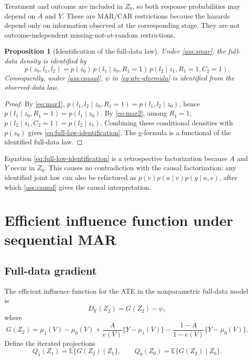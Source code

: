 \documentclass[11pt]{article}
\newtheorem{proposition}{Proposition}
\theoremstyle{definition}
\newcommand{\E}{\mathbb{E}}
\newcommand{\1}{\mathbf{1}}
\newcommand{\F}{\mathrm{F}}
\begin{document}
Treatment and outcome are included in $Z_0$, so both response probabilities may depend on $A$ and $Y$. These are MAR/CAR restrictions because the hazards depend only on information observed at the corresponding stage. They are not outcome-independent missing-not-at-random restrictions.

\begin{proposition}[Identification of the full-data law]\label{prop:identification}
Under \cref{ass:smar}, the full-data density is identified by
\begin{equation}\label{eq:full-law-identification}
p(z_0,l_1,l_2)
=p(z_0)\,p(l_1\mid z_0,R_1=1)\,
p(l_2\mid z_1,R_1=1,C_2=1).
\end{equation}
Consequently, under \cref{ass:causal}, $\psi$ in \cref{eq:ate-gformula} is identified from the observed-data law.
\end{proposition}

\begin{proof}
By \cref{eq:mar1}, $p(l_1,l_2\mid z_0,R_1=1)=p(l_1,l_2\mid z_0)$, hence $p(l_1\mid z_0,R_1=1)=p(l_1\mid z_0)$. By \cref{eq:mar2}, among $R_1=1$, $p(l_2\mid z_1,C_2=1)=p(l_2\mid z_1)$. Combining these conditional densities with $p(z_0)$ gives \cref{eq:full-law-identification}. The g-formula is a functional of the identified full-data law.
\end{proof}

Equation \cref{eq:full-law-identification} is a retrospective factorization because $A$ and $Y$ occur in $Z_0$. This causes no contradiction with the causal factorization: any identified joint law can also be refactored as $p(v)p(a\mid v)p(y\mid a,v)$, after which \cref{ass:causal} gives the causal interpretation.

\section{Efficient influence function under sequential MAR}

\subsection{Full-data gradient}

The efficient influence function for the ATE in the nonparametric full-data model is
\begin{equation}\label{eq:full-eif}
D_{\F}(Z_2)=G(Z_2)-\psi,
\end{equation}
where
\begin{equation}\label{eq:G}
G(Z_2)=\mu_1(V)-\mu_0(V)
+\frac{A}{e(V)}\{Y-\mu_1(V)\}
-\frac{1-A}{1-e(V)}\{Y-\mu_0(V)\}.
\end{equation}
Define the iterated projections
\begin{equation}\label{eq:Qs}
Q_1(Z_1)=\E\{G(Z_2)\mid Z_1\},\qquad
Q_0(Z_0)=\E\{G(Z_2)\mid Z_0\}.
\end{equation}
\end{document}
